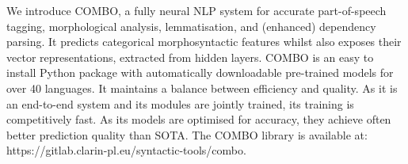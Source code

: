 We introduce COMBO, a fully neural NLP system for accurate part-of-speech tagging, morphological analysis, lemmatisation, and (enhanced) dependency parsing. It predicts categorical morphosyntactic features whilst also exposes their vector representations, extracted from hidden layers. COMBO is an easy to install Python package with automatically downloadable pre-trained models for over 40 languages. It maintains a balance between efficiency and quality. As it is an end-to-end system and its modules are jointly trained, its training is competitively fast. As its models are optimised for accuracy, they achieve often better prediction quality than SOTA. The COMBO library is available at: https://gitlab.clarin-pl.eu/syntactic-tools/combo.